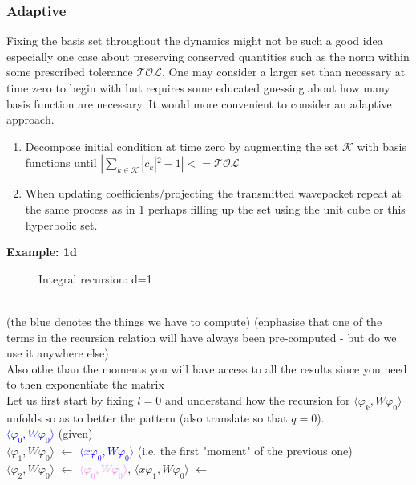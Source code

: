 \subsubsection{Adaptive}
Fixing the basis set throughout the dynamics might not 
be such a good idea especially one case about preserving 
conserved quantities such as the norm within some prescribed 
tolerance $\mathcal{TOL}$. One may consider a larger set than 
necessary at time zero to begin with but requires some educated 
guessing about how many basis function are necessary. It would more 
convenient to consider an adaptive approach. 
\begin{enumerate}
  \item Decompose initial condition at time zero by 
    augmenting the set $\mathcal{K}$ with basis functions until 
    $|\sum_{k \in \mathcal{K}} |c_{k}|^2  - 1| <= \mathcal{TOL}$
  \item When updating coefficients/projecting the transmitted wavepacket
    repeat at the same process as in 1 perhaps filling up the set using the 
    unit cube or this hyperbolic set.
\end{enumerate}
\textbf{Example: 1d}
\\
\begin{figure}[ht]
    \centering
    \caption{Integral recursion: d=1}
    \label{fig:integral_recursion}
\end{figure}
\\
(the blue denotes the things we have to compute)
(enphasise that one of the terms in the recursion relation 
will have always been pre-computed - but do we use it anywhere else)
\\
Also othe than the moments you will have access to all the results 
since you need to then exponentiate the matrix
\\
Let us first start by fixing $l=0$ and understand how the recursion for 
$\langle \varphi_k, W \varphi_0 \rangle$ unfolds so as to better the 
pattern (also translate so that 
$q=0$). 
\\
\textcolor{blue}{$\langle \varphi_0, W \varphi_0 \rangle$} (given)
\\
$\langle \varphi_1, W \varphi_0 \rangle$ $\leftarrow$  
\textcolor{blue}{$\langle x \varphi_0, W \varphi_0 \rangle$}
(i.e. the first "moment" of the previous one)
\\
$\langle \varphi_2, W \varphi_0 \rangle$ 
$\leftarrow$  
\textcolor{violet}{$\langle \varphi_0, W \varphi_0 \rangle$},
$\langle x \varphi_1, W \varphi_0 \rangle$
$\leftarrow$  
